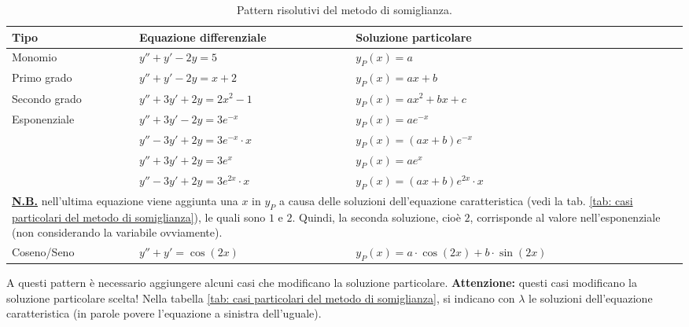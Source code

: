 \documentclass[a4paper]{article}
\begin{document}
	\begin{table}[!htp]
		\centering
		\begin{tabular}{@{} l l l @{}}
			\toprule
			\textbf{Tipo}	& \textbf{Equazione differenziale} & \textbf{Soluzione particolare} \\
			\midrule
			Monomio	& $y'' + y' - 2y = 5$ & $y_{P}\left(x\right) = a$ \\
			\cmidrule{1-3}
			Primo grado 	& $y'' + y' - 2y = x + 2$ & $y_{P}\left(x\right) = ax + b$ \\ 
			\cmidrule{1-3} 
			Secondo grado	& $y'' + 3y' + 2y = 2x^{2} - 1$ & $y_{P}\left(x\right) = ax^{2} + bx + c$ \\
			\cmidrule{1-3} 
			\multirow{4}{*}{Esponenziale} 	& $y'' + 3y' - 2y = 3e^{-x}$	& $y_{P}\left(x\right) = ae^{-x}$ \\ [.3em]
			& $y'' - 3y' + 2y = 3e^{-x} \cdot x$	& $y_{P}\left(x\right) = \left(ax + b\right) e^{-x}$ \\ [.3em]
			& $y'' + 3y' + 2y = 3e^{x}$	& $y_{P}\left(x\right) = ae^{x}$ \\ [.3em]
			& $y'' - 3y' + 2y = 3e^{2x} \cdot x$	& $y_{P}\left(x\right) = \left(ax + b\right) e^{2x} \cdot x$ \\ [.3em]
			\multicolumn{3}{p{35em}}{\textbf{\underline{N.B.}} nell'ultima equazione viene aggiunta una $x$ in $y_{P}$ a causa delle soluzioni dell'equazione caratteristica (vedi la tab. \ref{tab: casi particolari del metodo di somiglianza}), le quali sono $1$ e $2$. Quindi, la seconda soluzione, cioè $2$, corrisponde al valore nell'esponenziale (non considerando la variabile ovviamente).} \\
			\cmidrule{1-3}
			Coseno/Seno 	& $y'' + y' = \cos\left(2x\right)$ & $y_{P}\left(x\right) = a \cdot \cos\left(2x\right) + b \cdot \sin\left(2x\right)$ \\
			\bottomrule
		\end{tabular}
		\caption{Pattern risolutivi del metodo di somiglianza.}
		\label{tab: pattern risolutivi del metodo di somiglianza}
	\end{table}

	\noindent
	A questi pattern è necessario aggiungere alcuni casi che modificano la soluzione particolare. \textbf{Attenzione:} questi casi modificano la soluzione particolare scelta! Nella tabella \ref{tab: casi particolari del metodo di somiglianza}, si indicano con $\lambda$ le soluzioni dell'equazione caratteristica (in parole povere l'equazione a sinistra dell'uguale).\newline
\end{document}
